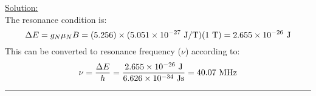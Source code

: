 \noindent
\underline{Solution:}\\

\noindent
The resonance condition is:
$$\Delta E = g_N\mu_NB = (5.256)\times(5.051\times 10^{-27}\textnormal{ J/T})(1\textnormal{ T}) = 2.655\times 10^{-26}\textnormal{ J}$$
This can be converted to resonance frequency ($\nu$) according to:
$$\nu = \frac{\Delta E}{h} = \frac{2.655\times 10^{-26}\textnormal{ J}}{6.626\times 10^{-34}\textnormal{ Js}} = 40.07\textnormal{ MHz}$$

\hrule\vspace{0.5cm}



